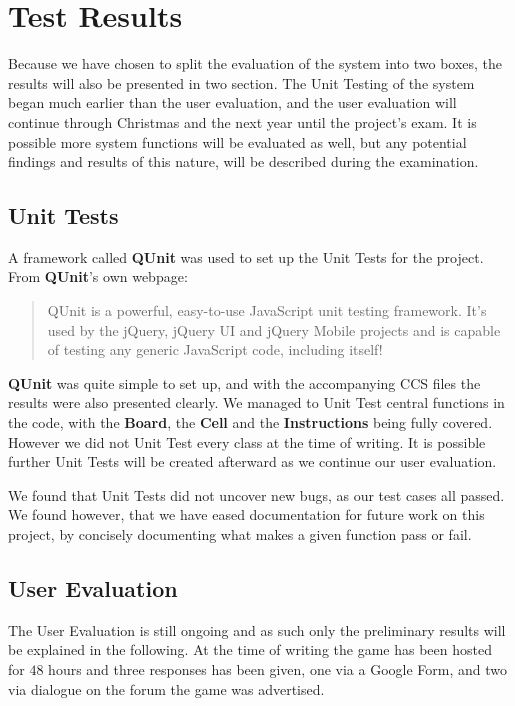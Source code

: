\section{Test Results}
\label{sec:testresults}

Because we have chosen to split the evaluation of the system into two boxes, the results will also be presented in two section. The Unit Testing of the system began much earlier than the user evaluation, and the user evaluation will continue through Christmas and the next year until the project's exam. It is possible more system functions will be evaluated as well, but any potential findings and results of this nature, will be described during the examination.

\subsection{Unit Tests}

A framework called \textbf{QUnit} was used to set up the Unit Tests for the project.
From \textbf{QUnit}'s own webpage:

\begin{quotation}
QUnit is a powerful, easy-to-use JavaScript unit testing framework. It's used by the jQuery, jQuery UI and jQuery Mobile projects and is capable of testing any generic JavaScript code, including itself!\cite{qunit}
\end{quotation}

\textbf{QUnit} was quite simple to set up, and with the accompanying CCS files the results were also presented clearly. We managed to Unit Test central functions in the code, with the \textbf{Board}, the \textbf{Cell} and the \textbf{Instructions} being fully covered.  However we did not Unit Test every class at the time of writing. It is possible further Unit Tests will be created afterward as we continue our user evaluation.


We found that Unit Tests did not uncover new bugs, as our test cases all passed. We found however, that we have eased documentation for future work on this project, by concisely documenting what makes a given function pass or fail.


\subsection{User Evaluation}

The User Evaluation is still ongoing and as such only the preliminary results will be explained in the following. At the time of writing the game has been hosted for $48$ hours and three responses has been given, one via a Google Form, and two via dialogue on the forum the game was advertised.


